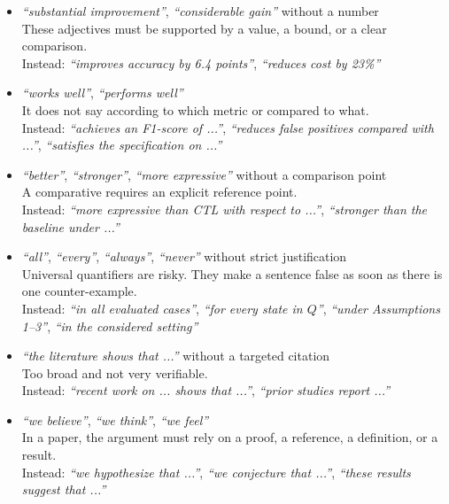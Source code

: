 \documentclass[11pt,a4paper]{article}
\theoremstyle{definition}
\begin{document}
\begin{itemize}
    \item \textit{``substantial improvement''}, \textit{``considerable gain''} without a number \\
    These adjectives must be supported by a value, a bound, or a clear comparison. \\
    Instead: \textit{``improves accuracy by 6.4 points''}, \textit{``reduces cost by 23\%''}

    \item \textit{``works well''}, \textit{``performs well''} \\
    It does not say according to which metric or compared to what. \\
    Instead: \textit{``achieves an F1-score of ...''}, \textit{``reduces false positives compared with ...''}, \textit{``satisfies the specification on ...''}

    \item \textit{``better''}, \textit{``stronger''}, \textit{``more expressive''} without a comparison point \\
    A comparative requires an explicit reference point. \\
    Instead: \textit{``more expressive than CTL with respect to ...''}, \textit{``stronger than the baseline under ...''}

    \item \textit{``all''}, \textit{``every''}, \textit{``always''}, \textit{``never''} without strict justification \\
    Universal quantifiers are risky. They make a sentence false as soon as there is one counter-example. \\
    Instead: \textit{``in all evaluated cases''}, \textit{``for every state in $Q$''}, \textit{``under Assumptions 1--3''}, \textit{``in the considered setting''}

    \item \textit{``the literature shows that ...''} without a targeted citation \\
    Too broad and not very verifiable. \\
    Instead: \textit{``recent work on ... shows that ...''}, \textit{``prior studies \cite{...,...} report ...''}

    \item \textit{``we believe''}, \textit{``we think''}, \textit{``we feel''} \\
    In a paper, the argument must rely on a proof, a reference, a definition, or a result. \\
    Instead: \textit{``we hypothesize that ...''}, \textit{``we conjecture that ...''}, \textit{``these results suggest that ...''}


\end{itemize}
\end{document}
